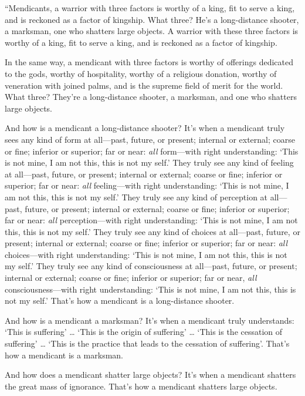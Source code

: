 \documentclass[12pt,openany]{book}%
\begin{document}
“Mendicants, a warrior with three factors is worthy of a king, fit to serve a king, and is reckoned as a factor of kingship. What three? He’s a long-distance shooter, a marksman, one who shatters large objects. A warrior with these three factors is worthy of a king, fit to serve a king, and is reckoned as a factor of kingship. 

In the same way, a mendicant with three factors is worthy of offerings dedicated to the gods, worthy of hospitality, worthy of a religious donation, worthy of veneration with joined palms, and is the supreme field of merit for the world. What three? They’re a long-distance shooter, a marksman, and one who shatters large objects. 

And how is a mendicant a long-distance shooter? It’s when a mendicant truly sees any kind of form at all—past, future, or present; internal or external; coarse or fine; inferior or superior; far or near: \emph{all} form—with right understanding: ‘This is not mine, I am not this, this is not my self.’ They truly see any kind of feeling at all—past, future, or present; internal or external; coarse or fine; inferior or superior; far or near: \emph{all} feeling—with right understanding: ‘This is not mine, I am not this, this is not my self.’ They truly see any kind of perception at all—past, future, or present; internal or external; coarse or fine; inferior or superior; far or near: \emph{all} perception—with right understanding: ‘This is not mine, I am not this, this is not my self.’ They truly see any kind of choices at all—past, future, or present; internal or external; coarse or fine; inferior or superior; far or near: \emph{all} choices—with right understanding: ‘This is not mine, I am not this, this is not my self.’ They truly see any kind of consciousness at all—past, future, or present; internal or external; coarse or fine; inferior or superior; far or near, \emph{all} consciousness—with right understanding: ‘This is not mine, I am not this, this is not my self.’ That’s how a mendicant is a long-distance shooter. 

And how is a mendicant a marksman? It’s when a mendicant truly understands: ‘This is suffering’ … ‘This is the origin of suffering’ … ‘This is the cessation of suffering’ … ‘This is the practice that leads to the cessation of suffering’. That’s how a mendicant is a marksman. 

And how does a mendicant shatter large objects? It’s when a mendicant shatters the great mass of ignorance. That’s how a mendicant shatters large objects. 
\end{document}
